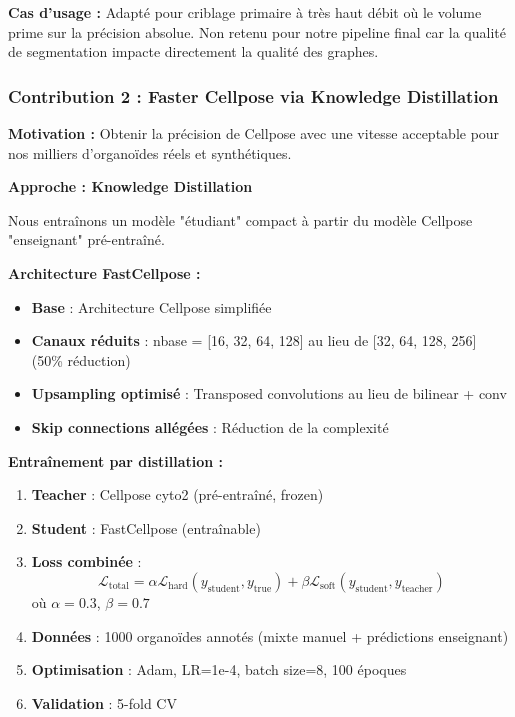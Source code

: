 \textbf{Cas d'usage :}
Adapté pour criblage primaire à très haut débit où le volume prime sur la précision absolue. Non retenu pour notre pipeline final car la qualité de segmentation impacte directement la qualité des graphes.

\subsubsection{Contribution 2 : Faster Cellpose via Knowledge Distillation}

\textbf{Motivation :}
Obtenir la précision de Cellpose avec une vitesse acceptable pour nos milliers d'organoïdes réels et synthétiques.

\textbf{Approche : Knowledge Distillation}

Nous entraînons un modèle "étudiant" compact à partir du modèle Cellpose "enseignant" pré-entraîné.

\textbf{Architecture FastCellpose :}
\begin{itemize}
    \item \textbf{Base} : Architecture Cellpose simplifiée
    \item \textbf{Canaux réduits} : nbase = [16, 32, 64, 128] au lieu de [32, 64, 128, 256] (50\% réduction)
    \item \textbf{Upsampling optimisé} : Transposed convolutions au lieu de bilinear + conv
    \item \textbf{Skip connections allégées} : Réduction de la complexité
\end{itemize}

\textbf{Entraînement par distillation :}
\begin{enumerate}
    \item \textbf{Teacher} : Cellpose cyto2 (pré-entraîné, frozen)
    \item \textbf{Student} : FastCellpose (entraînable)
    \item \textbf{Loss combinée} :
        \[
        \mathcal{L}_{\text{total}} = \alpha \mathcal{L}_{\text{hard}}(y_{\text{student}}, y_{\text{true}}) + \beta \mathcal{L}_{\text{soft}}(y_{\text{student}}, y_{\text{teacher}})
        \]
        où $\alpha = 0.3$, $\beta = 0.7$
    \item \textbf{Données} : 1000 organoïdes annotés (mixte manuel + prédictions enseignant)
    \item \textbf{Optimisation} : Adam, LR=1e-4, batch size=8, 100 époques
    \item \textbf{Validation} : 5-fold CV
\end{enumerate}

